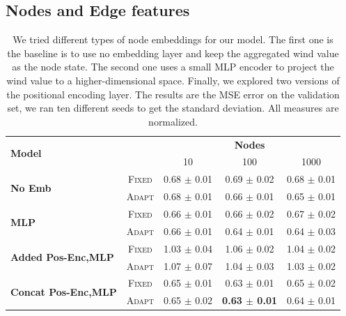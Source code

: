 \documentclass[a4paper,10pt]{article}
\begin{document}
\subsection{Nodes and Edge features}

\begin{table}
  \label{tab:nodes}
  \centering
  \begin{tabular}{lcccc} \toprule
    \multirow{2}{*}{\textbf{Model}}              &                            & \multicolumn{3}{c}{\textbf{Nodes}}                                                          \\ \cmidrule(lr){3-5}
                                                 &                            & 10                                 & 100                            & 1000                  \\ \hline
    \multirow{2}{*}{\textbf{No Emb}}             & \scriptsize \textsc{Fixed} & 0.68 \tiny $\pm$ 0.01              & 0.69 \tiny $\pm$ 0.02          & 0.68 \tiny $\pm$ 0.01 \\
                                                 & \scriptsize \textsc{Adapt} & 0.68 \tiny $\pm$ 0.01              & 0.66 \tiny $\pm$ 0.01          & 0.65 \tiny $\pm$ 0.01 \\
    \multirow{2}{*}{\textbf{MLP}}                & \scriptsize \textsc{Fixed} & 0.66 \tiny $\pm$ 0.01              & 0.66 \tiny $\pm$ 0.02          & 0.67 \tiny $\pm$ 0.02 \\
                                                 & \scriptsize \textsc{Adapt} & 0.66 \tiny $\pm$ 0.01              & 0.64 \tiny $\pm$ 0.01          & 0.64 \tiny $\pm$ 0.03 \\
    \multirow{2}{*}{\textbf{Added Pos-Enc,MLP}}  & \scriptsize \textsc{Fixed} & 1.03 \tiny $\pm$ 0.04              & 1.06 \tiny $\pm$ 0.02          & 1.04 \tiny $\pm$ 0.02 \\
                                                 & \scriptsize \textsc{Adapt} & 1.07 \tiny $\pm$ 0.07              & 1.04 \tiny $\pm$ 0.03          & 1.03 \tiny $\pm$ 0.02 \\
    \multirow{2}{*}{\textbf{Concat Pos-Enc,MLP}} & \scriptsize \textsc{Fixed} & 0.65 \tiny $\pm$ 0.01              & 0.63 \tiny $\pm$ 0.01          & 0.65 \tiny $\pm$ 0.02 \\
                                                 & \scriptsize \textsc{Adapt} & 0.65 \tiny $\pm$ 0.02              & \textbf{0.63 \tiny $\pm$ 0.01} & 0.64 \tiny $\pm$ 0.01 \\
    \bottomrule
  \end{tabular}
  \caption{
    We tried different types of node embeddings for our model. The first one is the baseline is to use no embedding layer and keep the aggregated wind value as the node state. The second one uses a small MLP encoder to project the wind value to a higher-dimensional space. Finally, we explored two versions of the positional encoding layer. The results are the MSE error on the validation set, we ran ten different seeds to get the standard deviation. All measures are normalized.
  }
\end{table}
\end{document}
